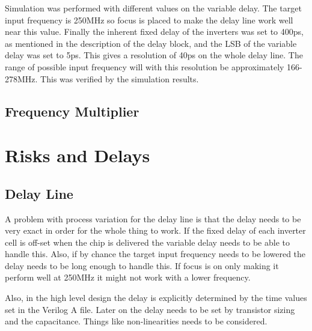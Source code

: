 \documentclass[a4paper,12pt]{article} \usepackage{graphicx}
\begin{document}
Simulation was performed with different values on the variable
delay. The target input frequency is 250MHz so focus is placed to make
the delay line work well near this value. Finally the inherent fixed
delay of the inverters was set to 400ps, as mentioned in the
description of the delay block, and the
LSB of the variable delay was set to 5ps. This gives a resolution of
40ps on the whole delay line. The range of possible input frequency
will with this resolution be approximately 166-278MHz. This was
verified by the simulation results.
\subsection{Frequency Multiplier}

\section{Risks and Delays}
\subsection{Delay Line}
A problem with process variation for the delay line is that the delay
needs to be very exact in order for the whole thing to work. If the
fixed delay of each inverter cell is off-set when the chip is
delivered the variable delay needs to be able to handle this. Also,
if by chance the target input frequency needs to be lowered the delay
needs to be long enough to handle this. If focus is on only making it
perform well at 250MHz it might not work with a lower frequency. 

Also, in the high level design the delay is explicitly determined by
the time values set in the Verilog A file. Later on the delay needs to
be set by transistor sizing and the capacitance. Things like
non-linearities needs to be considered.
\end{document}
